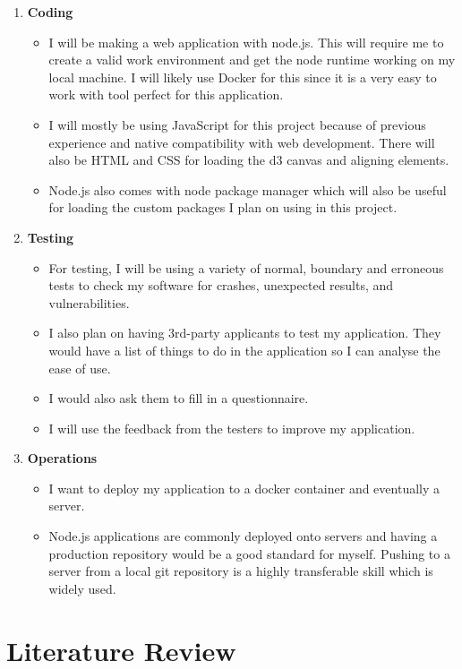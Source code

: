 \documentclass{report}
\begin{document}
\begin{enumerate}
    \item \textbf{\large{Coding}}
    \begin{itemize}
        \item I will be making a web application with node.js. This will require me to create a valid work environment and get the node runtime working on my local machine. I will likely use Docker for this since it is a very easy to work with tool perfect for this application.
        \item I will mostly be using JavaScript for this project because of previous experience and native compatibility with web development. There will also be HTML and CSS for loading the d3 canvas and aligning elements.
        \item Node.js also comes with node package manager which will also be useful for loading the custom packages I plan on using in this project.
    \end{itemize}
    \item \textbf{\large{Testing}}
    \begin{itemize}
        \item For testing, I will be using a variety of normal, boundary and erroneous tests to check my software for crashes, unexpected results, and vulnerabilities.
        \item I also plan on having 3rd-party applicants to test my application. They would have a list of things to do in the application so I can analyse the ease of use.
        \item I would also ask them to fill in a questionnaire.
        \item I will use the feedback from the testers to improve my application.
    \end{itemize}
    \item \textbf{\large{Operations}}
    \begin{itemize}
        \item I want to deploy my application to a docker container and eventually a server.
        \item Node.js applications are commonly deployed onto servers and having a production repository would be a good standard for myself. Pushing to a server from a local git repository is a highly transferable skill which is widely used.
    \end{itemize}
\end{enumerate}

\newpage
\chapter{Literature Review}
\end{document}
